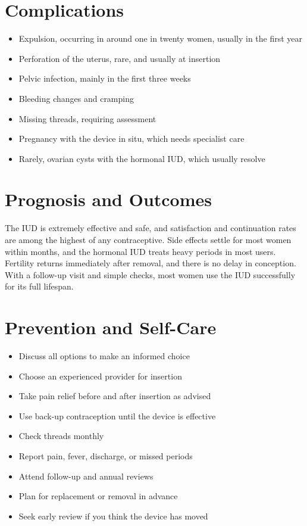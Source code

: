 \section*{Complications}
\begin{itemize}
    \item Expulsion, occurring in around one in twenty women, usually in the first year
    \item Perforation of the uterus, rare, and usually at insertion
    \item Pelvic infection, mainly in the first three weeks
    \item Bleeding changes and cramping
    \item Missing threads, requiring assessment
    \item Pregnancy with the device in situ, which needs specialist care
    \item Rarely, ovarian cysts with the hormonal IUD, which usually resolve
\end{itemize}

\section*{Prognosis and Outcomes}
The IUD is extremely effective and safe, and satisfaction and continuation rates are among the highest of any contraceptive. Side effects settle for most women within months, and the hormonal IUD treats heavy periods in most users. Fertility returns immediately after removal, and there is no delay in conception. With a follow-up visit and simple checks, most women use the IUD successfully for its full lifespan.

\section*{Prevention and Self-Care}
\begin{itemize}
    \item Discuss all options to make an informed choice
    \item Choose an experienced provider for insertion
    \item Take pain relief before and after insertion as advised
    \item Use back-up contraception until the device is effective
    \item Check threads monthly
    \item Report pain, fever, discharge, or missed periods
    \item Attend follow-up and annual reviews
    \item Plan for replacement or removal in advance
    \item Seek early review if you think the device has moved
\end{itemize}

